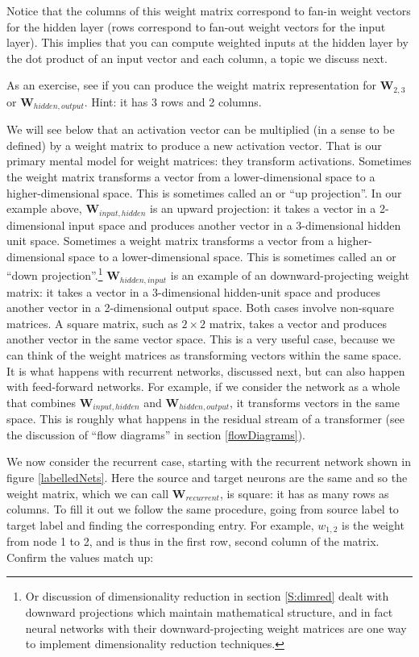 \noindent Notice that the columns of this weight matrix correspond to fan-in weight vectors for the hidden layer (rows correspond to fan-out weight vectors for the input layer). This implies that you can compute weighted inputs at the hidden layer by the dot product of an input vector and each column, a topic we discuss next.

As an exercise, see if you can produce the weight matrix representation for $\textbf{W}_{2,3}$ or $\textbf{W}_{hidden,output}$. Hint: it has 3 rows and 2 columns. 

We will see below that an activation vector can be multiplied (in a sense to be defined) by a weight matrix to produce a new activation vector. That is our primary mental model for weight matrices: they transform activations. Sometimes the weight matrix transforms a vector from a lower-dimensional space to a higher-dimensional space. This is sometimes called an  or ``up projection''. In our example above, $\textbf{W}_{input, hidden}$ is an upward projection: it takes a vector in a 2-dimensional input space and produces another vector in a 3-dimensional hidden unit space. Sometimes a weight matrix  transforms a vector from a higher-dimensional space to a lower-dimensional space. This is sometimes called an  or ``down projection''.\footnote{Or discussion of dimensionality reduction in section \ref{S:dimred} dealt with downward projections which maintain mathematical structure, and in fact neural networks with their downward-projecting weight matrices are one way to implement dimensionality reduction techniques.} $\textbf{W}_{hidden, input}$ is an example of an downward-projecting weight matrix: it takes a vector in a 3-dimensional hidden-unit space and produces another vector in a 2-dimensional output space. Both cases involve non-square matrices. A square matrix, such as $2 \times 2$ matrix, takes a vector and produces another vector in the same vector space. This is a very useful case, because we can think of the weight matrices as transforming vectors within the same space. It is what happens with recurrent networks, discussed next, but can also happen with feed-forward networks. For example, if we consider the network as a whole that combines  $\textbf{W}_{input, hidden}$ and  $\textbf{W}_{hidden, output}$, it transforms vectors in the same space. This is roughly what happens in the residual stream of a transformer (see the discussion of ``flow diagrams'' in section \ref{flowDiagrams}). 

We now consider the recurrent case, starting with the recurrent network shown in figure \ref{labelledNets}. Here the source and target neurons are the same and so the weight matrix, which we can call $\textbf{W}_{recurrent}$, is square: it has as many rows as columns. To fill it out we follow the same procedure, going from source label to target label and finding the corresponding entry. For example, $w_{1,2}$ is the weight from node 1 to 2, and is thus in the first row, second column of the matrix. Confirm the values match up:


